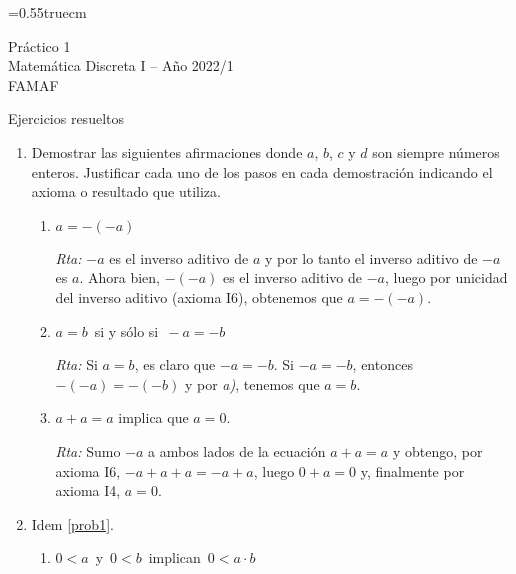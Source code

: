 \documentclass[a4paper,12pt,twoside,spanish,reqno]{amsbook}
\numberwithin{equation}{section}
\newcommand{\rta}{\noindent\textit{Rta: }}
\begin{document}
    \baselineskip=0.55truecm %
    

    
    
    {\bf \begin{center} Práctico 1 \\ Matemática Discreta I -- Año 2022/1 \\ FAMAF \end{center}}
    
    {\bf \begin{center} Ejercicios resueltos \end{center}}
    
    
    
    \begin{enumerate}
    \setlength\itemsep{1.1em}
        
        \item\label{prob1} Demostrar las siguientes afirmaciones donde $a$, $b$, $c$ y $d$ son siempre números enteros. Justificar cada uno de los pasos en cada demostración indicando el axioma o resultado que utiliza.
        \begin{enumerate}
            \item  $a=-(-a)$
            
            \rta $-a$  es el inverso aditivo de $a$ y por lo tanto el inverso aditivo de $-a$ es $a$.  Ahora bien, $-(-a)$  es el inverso aditivo de  $-a$, luego por  unicidad del inverso aditivo (axioma { I6}), obtenemos que $a = -(-a)$.
            
            \item  $a=b\,$ si y sólo si $\,-a=-b$
            
            \rta Si  $a=b$, es claro que $-a=-b$. Si $-a= -b$, entonces $-(-a) = -(-b)$ y  por \textit{a)}, tenemos que $a=b$.  
            
            \item  $a+a=a$ implica que  $a=0$.
            
            \rta Sumo $-a$ a ambos lados de la ecuación  $a+a=a$ y obtengo, por axioma I6,  $-a + a + a = -a +a$, luego $0 +a = 0$ y, finalmente por axioma I4, $a=0$. 
            
        \end{enumerate}
        
    
        
        \item Idem \ref{prob1}.
        
        \begin{enumerate}
            \item $0<a\,$ y $\,0<b\,$ implican $\,0<a\cdot b$
            

\end{enumerate}
\end{enumerate}
\end{document}
